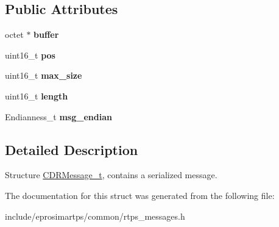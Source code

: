 \subsection*{\-Public \-Attributes}
\begin{DoxyCompactItemize}
\item 
\hypertarget{structeprosima_1_1rtps_1_1_c_d_r_message__t_a4227795788871146a404d5e81872e0c1}{octet $\ast$ {\bfseries buffer}}\label{structeprosima_1_1rtps_1_1_c_d_r_message__t_a4227795788871146a404d5e81872e0c1}

\item 
\hypertarget{structeprosima_1_1rtps_1_1_c_d_r_message__t_a0ba855092e42795caf86455fe4d39f25}{uint16\-\_\-t {\bfseries pos}}\label{structeprosima_1_1rtps_1_1_c_d_r_message__t_a0ba855092e42795caf86455fe4d39f25}

\item 
\hypertarget{structeprosima_1_1rtps_1_1_c_d_r_message__t_a225841b777559e14183639f7f8b6d445}{uint16\-\_\-t {\bfseries max\-\_\-size}}\label{structeprosima_1_1rtps_1_1_c_d_r_message__t_a225841b777559e14183639f7f8b6d445}

\item 
\hypertarget{structeprosima_1_1rtps_1_1_c_d_r_message__t_a1aa7533a2864f28962bb4a79a149d7e1}{uint16\-\_\-t {\bfseries length}}\label{structeprosima_1_1rtps_1_1_c_d_r_message__t_a1aa7533a2864f28962bb4a79a149d7e1}

\item 
\hypertarget{structeprosima_1_1rtps_1_1_c_d_r_message__t_acc22fee55f3985112896db7f502f98bb}{\-Endianness\-\_\-t {\bfseries msg\-\_\-endian}}\label{structeprosima_1_1rtps_1_1_c_d_r_message__t_acc22fee55f3985112896db7f502f98bb}

\end{DoxyCompactItemize}


\subsection{\-Detailed \-Description}
\-Structure \hyperlink{structeprosima_1_1rtps_1_1_c_d_r_message__t}{\-C\-D\-R\-Message\-\_\-t}, contains a serialized message. 

\-The documentation for this struct was generated from the following file\-:\begin{DoxyCompactItemize}
\item 
include/eprosimartps/common/rtps\-\_\-messages.\-h\end{DoxyCompactItemize}
